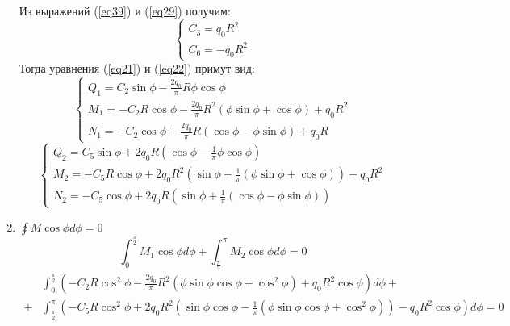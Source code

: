 \begin{enumerate}
    Из выражений (\ref{eq39}) и (\ref{eq29}) получим:
    \begin{equation}
        \label{eq40}
        \begin{cases}
            C_3 = q_0R^2
            \\
            C_6 = -q_0R^2
        \end{cases}
    \end{equation}
    Тогда уравнения (\ref{eq21}) и (\ref{eq22}) примут вид:
    \begin{equation}
        \label{eq41}
        \begin{cases}
            \displaystyle Q_1 = C_2 \sin \phi - \frac{2q_0}{\pi}R \phi \cos \phi
            \\[10pt]
            \displaystyle M_1 = - C_2 R \cos \phi - \frac{2q_0}{\pi}R^2 (\phi \sin \phi + \cos \phi) + q_0R^2
            \\[10pt]
            \displaystyle N_1 = - C_2 \cos \phi + \frac{2q_0}{\pi}R (\cos \phi - \phi \sin \phi) + q_0 R
        \end{cases}
    \end{equation}
    \begin{equation}
        \label{eq42}
        \begin{cases}
            \displaystyle Q_2 = C_5 \sin \phi + 2q_0 R (\cos \phi - \frac{1}{\pi}\phi \cos \phi)
            \\[10pt]
            \displaystyle M_2 = -C_5 R \cos \phi + 2q_0R^2 (\sin \phi - \frac{1}{\pi} (\phi \sin \phi + \cos \phi)) - q_0R^2
            \\[10pt]
            \displaystyle N_2 = - C_5 \cos \phi + 2q_0 R (\sin \phi + \frac{1}{\pi} (\cos \phi - \phi \sin \phi))
        \end{cases}
    \end{equation}
    \item $\oint M \cos \phi d \phi = 0$
    \begin{equation}
        \label{eq43}
        \int_{0}^{\frac{\pi}{2}}{M_1 \cos \phi d \phi} + \int_{\frac{\pi}{2}}^{\pi}{M_2 \cos \phi d \phi} = 0
    \end{equation}
    \begin{equation}
        \label{eq44}
        \begin{split}
            & \int_{0}^{\frac{\pi}{2}}{(-C_2R \cos^2 \phi - \frac{2q_0}{\pi}R^2 (\phi \sin \phi \cos \phi + \cos^2 \phi) + q_0R^2 \cos \phi)d \phi} +
            \\
            + & \int_{\frac{\pi}{2}}^{\pi}{(-C_5R \cos^2 \phi + 2q_0R^2 (\sin \phi \cos \phi - \frac{1}{\pi}(\phi \sin \phi \cos \phi + \cos^2 \phi)) - q_0R^2 \cos \phi)d \phi} = 0

\end{split}
\end{equation}
\end{enumerate}
